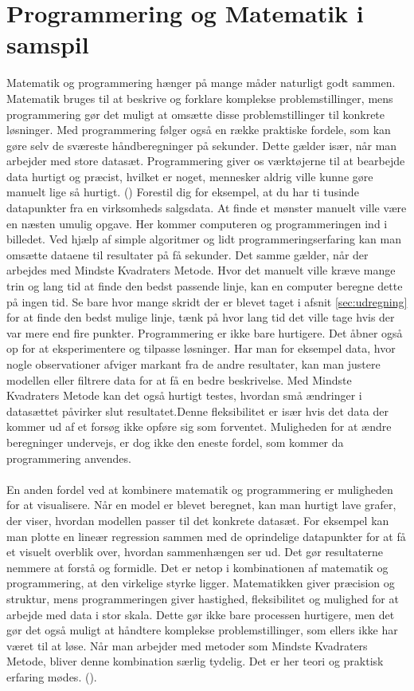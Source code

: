 \section{Programmering og Matematik i samspil}
Matematik og programmering hænger på mange måder naturligt godt sammen. Matematik bruges til at beskrive og forklare komplekse problemstillinger, mens programmering gør det muligt at omsætte disse problemstillinger til konkrete løsninger. Med programmering følger også en række praktiske fordele, som kan gøre selv de sværeste håndberegninger på sekunder. Dette gælder især, når man arbejder med store datasæt. Programmering giver os værktøjerne til at bearbejde data hurtigt og præcist, hvilket er noget, mennesker aldrig ville kunne gøre manuelt lige så hurtigt. (\cite{codeWithC}) Forestil dig for eksempel, at du har ti tusinde datapunkter fra en virksomheds salgsdata. At finde et mønster manuelt ville være en næsten umulig opgave. Her kommer computeren og programmeringen ind i billedet. Ved hjælp af simple algoritmer og lidt programmeringserfaring kan man omsætte dataene til resultater på få sekunder. Det samme gælder, når der arbejdes med Mindste Kvadraters Metode. Hvor det manuelt ville kræve mange trin og lang tid at finde den bedst passende linje, kan en computer beregne dette på ingen tid. Se bare hvor mange skridt der er blevet taget i afsnit \ref{sec:udregning} for at finde den bedst mulige linje, tænk på hvor lang tid det ville tage hvis der var mere end fire punkter. Programmering er ikke bare hurtigere. Det åbner også op for at eksperimentere og tilpasse løsninger. Har man for eksempel data, hvor nogle observationer afviger markant fra de andre resultater, kan man justere modellen eller filtrere data for at få en bedre beskrivelse. Med Mindste Kvadraters Metode kan det også hurtigt testes, hvordan små ændringer i datasættet påvirker slut resultatet.Denne fleksibilitet er især hvis det data der kommer ud af et forsøg ikke opføre sig som forventet. Muligheden for at ændre beregninger undervejs, er dog ikke den eneste fordel, som kommer da programmering anvendes. \\\\ En anden fordel ved at kombinere matematik og programmering er muligheden for at visualisere. Når en model er blevet beregnet, kan man hurtigt lave grafer, der viser, hvordan modellen passer til det konkrete datasæt. For eksempel kan man plotte en lineær regression sammen med de oprindelige datapunkter for at få et visuelt overblik over, hvordan sammenhængen ser ud. Det gør resultaterne nemmere at forstå og formidle. Det er netop i kombinationen af matematik og programmering, at den virkelige styrke ligger. Matematikken giver præcision og struktur, mens programmeringen giver hastighed, fleksibilitet og mulighed for at arbejde med data i stor skala. Dette gør ikke bare processen hurtigere, men det gør det også muligt at håndtere komplekse problemstillinger, som ellers ikke har været til at løse. Når man arbejder med metoder som Mindste Kvadraters Metode, bliver denne kombination særlig tydelig. Det er her teori og praktisk erfaring mødes. (\cite{geeksforgeeks}). \\ %

